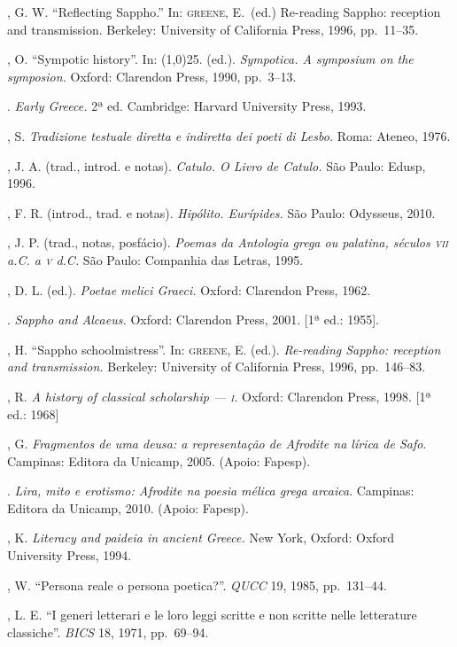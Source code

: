 \begin{bibliohedra}
, G. W. ``Reflecting Sappho.'' In: \textsc{greene}, E.~(ed.) 
Re-reading Sappho: reception and transmission. Berkeley: University of California Press,
1996, pp.~11--35.

, O. “Sympotic history”. In: \line(1,0){25}. (ed.).
\textit{Sympotica. A symposium on the symposion.} Oxford: Clarendon Press,
1990, pp.~3--13.

\titidem. \textit{Early Greece.} 2ª ed.
Cambridge: Harvard University Press, 1993.

, S. \textit{Tradizione testuale diretta e indiretta dei poeti
di Lesbo.} Roma: Ateneo, 1976. 

, J. A. (trad., introd. e notas). \textit{Catulo. O Livro de
Catulo.} São Paulo: Edusp, 1996.

, F. R. (introd., trad. e notas). \textit{Hipólito. Eurípides.}
São Paulo: Odysseus, 2010.

, J. P. (trad., notas, posfácio). \textit{Poemas da Antologia grega
ou palatina, séculos \textsc{vii} a.C. a \textsc{v} d.C.} São Paulo: Companhia das Letras, 1995.

, D. L. (ed.). \textit{Poetae melici Graeci.} Oxford: Clarendon
Press, 1962.

\titidem. \textit{Sappho and Alcaeus.} Oxford: Clarendon
Press, 2001. [1ª ed.: 1955].

, H. “Sappho schoolmistress”. In: \textsc{greene}, E. (ed.).
\textit{Re-reading Sappho: reception and transmission.} Berkeley: University of
California Press, 1996, pp.~146--83.

, R. \textit{A history of classical scholarship --- \textsc{i}.} Oxford:
Clarendon Press, 1998. [1ª ed.: 1968]

, G. \textit{Fragmentos de uma deusa: a representação de Afrodite
na lírica de Safo}. Campinas: Editora da Unicamp, 2005. (Apoio: Fapesp).

\titidem. \textit{Lira, mito e erotismo: Afrodite na poesia mélica grega
arcaica}. Campinas: Editora da Unicamp, 2010. (Apoio: Fapesp).

, K. \textit{Literacy and paideia in ancient Greece.} New York,
Oxford: Oxford University Press, 1994.

, W. “Persona reale o persona poetica?”. \textit{QUCC} 19, 1985,
pp.~131--44.

, L. E. “I generi letterari e le loro leggi scritte e non scritte
nelle letterature classiche”. \textit{BICS} 18, 1971, pp.~69--94.


\end{bibliohedra}
